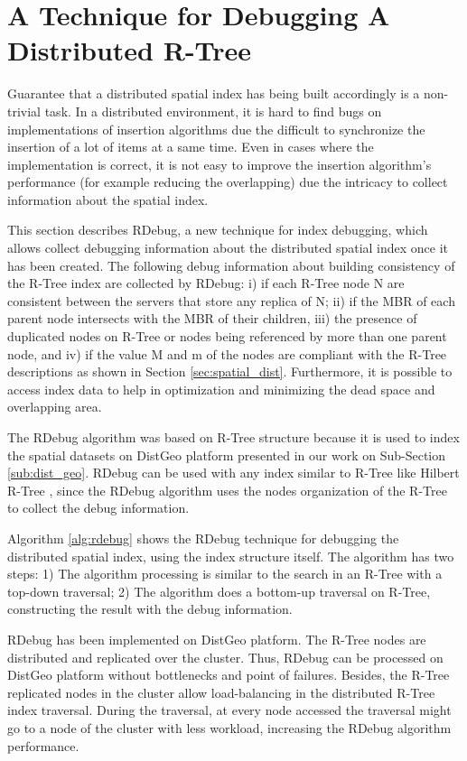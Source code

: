 \section{A Technique for Debugging A Distributed R-Tree}
\label{sec:rdebug}

Guarantee that a distributed spatial index has being built accordingly is a non-trivial task. 
In a distributed environment, it is hard to find bugs on implementations of insertion algorithms due the difficult to synchronize the insertion of a lot of items at a same time. 
Even in cases where the implementation is correct, it is not easy to improve the insertion algorithm's performance (for example reducing the overlapping) 
due the intricacy to collect information about the spatial index.

This section describes RDebug, a new technique for index debugging, which allows collect debugging information about the distributed spatial index once it has been created. 
The following debug information about building consistency of the R-Tree index are collected by RDebug: 
i) if each R-Tree node N are consistent between the servers that store any replica of N;
ii) if the MBR of each parent node intersects with the MBR of their children, 
iii) the presence of duplicated nodes on R-Tree or nodes being referenced by more than one parent node, and 
iv) if the value M and m of the nodes are compliant with the R-Tree descriptions as shown in Section \ref{sec:spatial_dist}. 
Furthermore, it is possible to access index data to help in optimization and minimizing  the dead space and overlapping area.

The RDebug algorithm was based on R-Tree structure because it is used to index the spatial datasets on DistGeo platform presented in our work on Sub-Section \ref{sub:dist_geo}.
RDebug can be used with any index similar to R-Tree like Hilbert R-Tree \cite{kamel1994hilbert}, 
since the RDebug algorithm uses the nodes organization of the R-Tree to collect the debug information.

Algorithm \ref{alg:rdebug} shows the RDebug technique for debugging the distributed spatial index, using the index structure itself. The algorithm has two steps:
1) The algorithm processing is similar to the search in an R-Tree with a top-down traversal; 
2) The algorithm does a bottom-up traversal on R-Tree, constructing the result with the debug information.

RDebug has been implemented on DistGeo platform. The R-Tree nodes are distributed and replicated over the cluster. 
Thus, RDebug can be processed on DistGeo platform without bottlenecks and point of failures. 
Besides, the R-Tree replicated nodes in the cluster allow load-balancing in the distributed R-Tree index traversal. 
During the traversal, at every node accessed the traversal might go to a node of the cluster with less workload, increasing the RDebug algorithm performance. 

